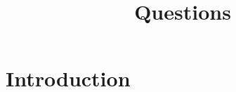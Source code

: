 \documentclass{beamer}
\title[Oral Exam]{Questions}
\author[M. Sidibe]{}
\begin{document}
\frame{\titlepage}

\section{Introduction}

\begin{frame}\frametitle{}
\end{frame}

\begin{frame}\frametitle{}
\end{frame}




\end{document}
